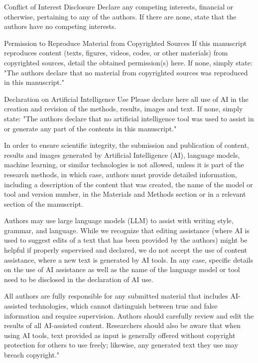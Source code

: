 \documentclass[titlepage]{geomorphica}
\begin{document}
\begin{closing}{Conflict of Interest Disclosure}
	Declare any competing interests, financial or otherwise, pertaining to any of the authors. If there are none, state that the authors have no competing interests.
\end{closing}
\begin{closing}{Permission to Reproduce Material from Copyrighted Sources}
	If this manuscript reproduces content (texts, figures, videos, codes, or other materials) from copyrighted sources, detail the obtained permission(s) here. If none, simply state: "The authors declare that no material from copyrighted sources was reproduced in this manuscript."
\end{closing}
\begin{closing}{Declaration on Artificial Intelligence Use}
	Please declare here all use of AI in the creation and revision of the methods, results, images and text. If none, simply state: "The authors declare that no artificial intelligence tool was used to assist in or generate any part of the contents in this manuscript."

	In order to ensure scientific integrity, the submission and publication of content, results and images generated by Artificial Intelligence (AI), language models, machine learning, or similar technologies is not allowed, unless it is part of the research methods, in which case, authors must provide detailed information, including a description of the content that was created, the name of the model or tool and version number, in the Materials and Methods section or in a relevant section of the manuscript.
	
	Authors may use large language models (LLM) to assist with writing style, grammar, and language. While we recognize that editing assistance (where AI is used to suggest edits of a text that has been provided by the authors) might be helpful if properly supervised and declared, we do not accept the use of content assistance, where a new text is generated by AI tools. In any case, specific details on the use of AI assistance as well as the name of the language model or tool need to be disclosed in the declaration of AI use.

	All authors are fully responsible for any submitted material that includes AI-assisted technologies, which cannot distinguish between true and false information and require supervision. Authors should carefully review and edit the results of all AI-assisted content.
Researchers should also be aware that when using AI tools, text provided as input is generally offered without copyright protection for others to use freely; likewise, any generated text they use may breach copyright."
\end{closing}
\end{document}
